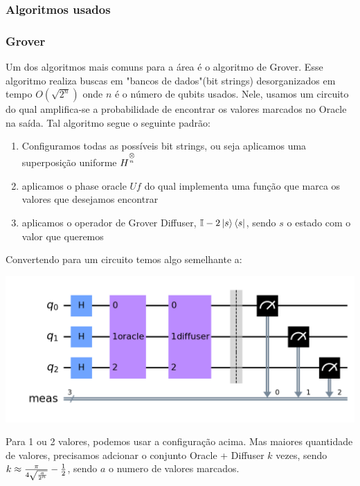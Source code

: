 \documentclass{article}
\newcommand{\tens}[1]{%
	\mathbin{\mathop{\otimes}\limits_{#1}}%
}
\begin{document}
\subsubsection{Algoritmos usados}

\subsubsection{Grover}
Um dos algoritmos mais comuns para a área é o algoritmo de Grover. Esse algoritmo realiza buscas em "bancos de dados"(bit strings) desorganizados em tempo $O(\sqrt{2^n})$ onde $n$ é o número de qubits usados. Nele, usamos um circuito do qual amplifica-se a probabilidade de encontrar os valores marcados no Oracle na saída.
Tal algoritmo segue o seguinte padrão: \
\begin{enumerate}
	\item{Configuramos todas as possíveis bit strings, ou seja aplicamos uma superposição uniforme $H^{\tens{^n}}$}
	\item{aplicamos o phase oracle $Uf$ do qual implementa uma função que marca os valores que desejamos encontrar}
	\item{aplicamos o operador de Grover Diffuser, $\mathbb{I} - 2 \mathinner{|{s}\rangle}\mathinner{\langle{s}|}$}, sendo $s$ o estado com o valor que queremos
\end{enumerate}

Convertendo para um circuito temos algo semelhante a:


\begin{center}
	\includegraphics[scale=0.3]{Grover.png}
	\label{fig:grover-default-circuit}
\end{center}

Para 1 ou 2 valores, podemos usar a configuração acima. Mas maiores quantidade de valores, precisamos adcionar o conjunto Oracle + Diffuser $k$ vezes, sendo $k \approx { {\pi \over {4 \sqrt{a\over{2^n}}}} - {1\over2}  }$, sendo $a$ o numero de valores marcados.
\end{document}

